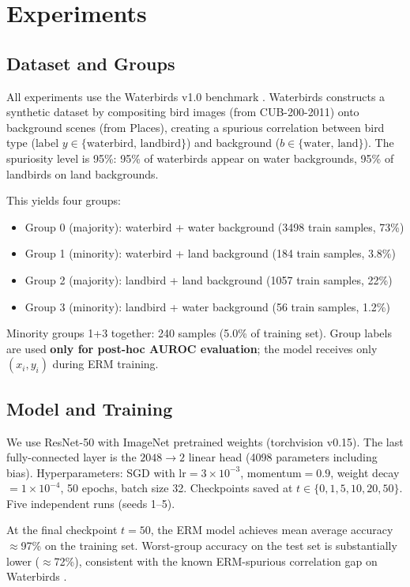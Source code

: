 \section{Experiments}
\label{sec:experiments}

\subsection{Dataset and Groups}

All experiments use the Waterbirds v1.0 benchmark \cite{sagawa2019distributionally}. Waterbirds constructs a synthetic dataset by compositing bird images (from CUB-200-2011) onto background scenes (from Places), creating a spurious correlation between bird type (label $y\in\{\text{waterbird, landbird}\}$) and background ($b\in\{\text{water, land}\}$). The spuriosity level is 95\%: 95\% of waterbirds appear on water backgrounds, 95\% of landbirds on land backgrounds.

This yields four groups:
\begin{itemize}
\item Group 0 (majority): waterbird + water background (3498 train samples, 73\%)
\item Group 1 (minority): waterbird + land background (184 train samples, 3.8\%)
\item Group 2 (majority): landbird + land background (1057 train samples, 22\%)
\item Group 3 (minority): landbird + water background (56 train samples, 1.2\%)
\end{itemize}

Minority groups 1+3 together: 240 samples (5.0\% of training set). Group labels are used \textbf{only for post-hoc AUROC evaluation}; the model receives only $(x_i, y_i)$ during ERM training.

\subsection{Model and Training}

We use ResNet-50 \cite{he2016deep} with ImageNet pretrained weights (torchvision v0.15). The last fully-connected layer is the $2048{\to}2$ linear head (4098 parameters including bias). Hyperparameters: SGD with lr$=3{\times}10^{-3}$, momentum$=0.9$, weight decay$=1{\times}10^{-4}$, 50 epochs, batch size 32. Checkpoints saved at $t\in\{0,1,5,10,20,50\}$. Five independent runs (seeds 1--5).

At the final checkpoint $t{=}50$, the ERM model achieves mean average accuracy $\approx$97\% on the training set. Worst-group accuracy on the test set is substantially lower ($\approx$72\%), consistent with the known ERM-spurious correlation gap on Waterbirds \cite{sagawa2019distributionally}.


